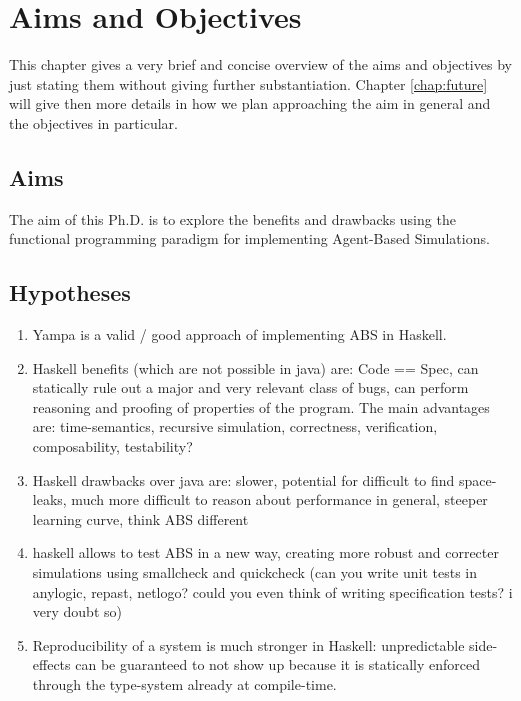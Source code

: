 \chapter{Aims and Objectives}
\label{chap:aimsObj}

This chapter gives a very brief and concise overview of the aims and objectives by just stating them without giving further substantiation. Chapter \ref{chap:future} will give then more details in how we plan approaching the aim in general and the objectives in particular.

\section{Aims}
The aim of this Ph.D. is to explore the benefits and drawbacks using the functional programming paradigm for implementing Agent-Based Simulations. 

\section{Hypotheses}
\begin{enumerate}
	\item Yampa is a valid / good approach of implementing ABS in Haskell.
	
	\item Haskell benefits (which are not possible in java) are: Code == Spec, can statically rule out a major and very relevant class of bugs, can perform reasoning and proofing of properties of the program. The main advantages are: time-semantics, recursive simulation, correctness, verification, composability, testability?

	\item Haskell drawbacks over java are: slower, potential for difficult to find space-leaks, much more difficult to reason about performance in general, steeper learning curve, think ABS different 
	
	\item haskell allows to test ABS in a new way, creating more robust and correcter simulations using smallcheck and quickcheck (can you write unit tests in anylogic, repast, netlogo? could you even think of writing specification tests? i very doubt so)
	
	\item Reproducibility of a system is much stronger in Haskell: unpredictable side-effects can be guaranteed to not show up because it is statically enforced through the type-system already at compile-time.
\end{enumerate}

